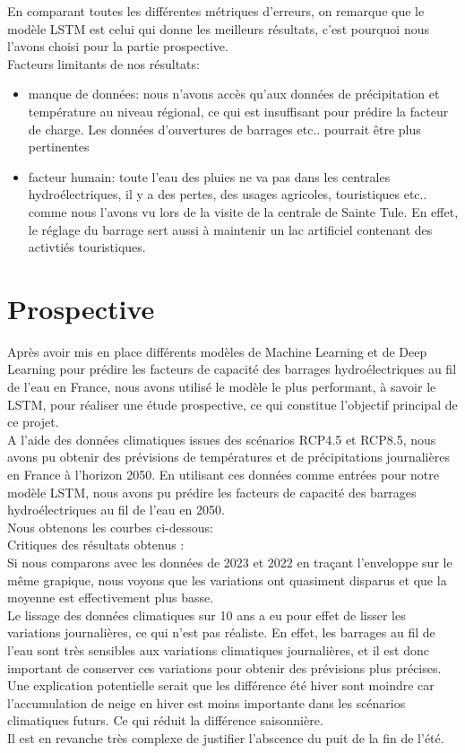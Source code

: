 \documentclass{article}
\theoremstyle{nopointbreak}
\theoremstyle{nobrkbold}
\begin{document}
En comparant toutes les différentes métriques d'erreurs, on remarque que le modèle LSTM est celui qui donne les meilleurs résultats, c'est pourquoi nous l'avons choisi pour la partie prospective. \\
Facteurs limitants de nos résultats: 
\begin{itemize}
    \item manque de données: nous n'avons accès qu'aux données de précipitation et température au niveau régional, ce qui est insuffisant pour prédire la facteur de charge. Les données d'ouvertures de barrages etc.. pourrait être plus pertinentes
    \item facteur humain: toute l'eau des pluies ne va pas dans les centrales hydroélectriques, il y a des pertes, des usages agricoles, touristiques etc.. comme nous l'avons vu lors de la visite de la centrale de Sainte Tule. En effet, le réglage du barrage sert aussi à maintenir un lac artificiel contenant des activtiés touristiques.
\end{itemize}

\newpage


\section{Prospective}

Après avoir mis en place différents modèles de Machine Learning et de Deep Learning pour prédire les facteurs de capacité des barrages hydroélectriques au fil de l'eau en France, nous avons utilisé le modèle le plus performant, à savoir le LSTM, pour réaliser une étude prospective, ce qui constitue l'objectif principal de ce projet. \\

A l'aide des données climatiques issues des scénarios RCP4.5 et RCP8.5, nous avons pu obtenir des prévisions de températures et de précipitations journalières en France à l'horizon 2050. En utilisant ces données comme entrées pour notre modèle LSTM, nous avons pu prédire les facteurs de capacité des barrages hydroélectriques au fil de l'eau en 2050. \\
Nous obtenons les courbes ci-dessous: \\


Critiques des résultats obtenus : \\
Si nous comparons avec les données de 2023 et 2022 en traçant l'enveloppe sur le même grapique, nous voyons que les variations ont quasiment disparus et que la moyenne est effectivement plus basse. \\
Le lissage des données climatiques sur 10 ans a eu pour effet de lisser les variations journalières, ce qui n'est pas réaliste. En effet, les barrages au fil de l'eau sont très sensibles aux variations climatiques journalières, et il est donc important de conserver ces variations pour obtenir des prévisions plus précises. \\
Une explication potentielle serait que les différence été hiver sont moindre car l'accumulation de neige en hiver est moins importante dans les scénarios climatiques futurs. Ce qui réduit la différence saisonnière. \\ 
Il est en revanche très complexe de justifier l'abscence du puit de la fin de l'été.
\end{document}
